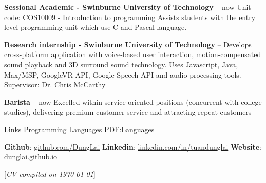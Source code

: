 \documentclass[letterpaper,MMMyyyy,nonstopmode]{simpleresumecv}
\newcommand{\CVNote}{CV compiled on {\today}}
\begin{document}
\begin{Body}
\BulletItem
\textbf{Sessional Academic - Swinburne University of Technology}
\hfill
{} -- now
\SubBulletItem Unit code: COS10009 - Introduction to programming
\SubBulletItem Assists students with the entry level programming unit which use C and Pascal language.

\BulletItem
\textbf{Research internship - Swinburne University of Technology}
\hfill
{} --
\SubBulletItem Develops cross-platform application with voice-based user interaction, motion-compensated sound playback and 3D surround sound technology.
\SubBulletItem Uses Javascript, Java, Max/MSP, GoogleVR API, Google Speech API and audio processing tools.
\SubBulletItem Supervisor: \href{https://www.swinburne.edu.au/science-engineering-technology/staff/profile/index.php?id=cdmccarthy}{\color{blue}Dr. Chris McCarthy}

\BulletItem
\textbf{Barista}
\hfill
{} --
now
\SubBulletItem Excelled within service-oriented positions (concurrent with college studies), delivering premium customer service and attracting repeat customers

\Section 
{Links}
{Programming Languages}
{PDF:Languages}

\BulletItem \textbf{Github}: \href{https://github.com/DungLai}{\color{blue}github.com/DungLai}
\BulletItem \textbf{Linkedin}: \href{https://www.linkedin.com/in/tuandunglai/}{\color{blue}linkedin.com/in/tuandunglai}
\BulletItem \textbf{Website}: \href{https://dunglai.github.io/}{\color{blue}dunglai.github.io}
\end{Body}



\BigGap
\UseNoteFont%
\null\hfill%
[\textit{\CVNote}]
\end{document}
